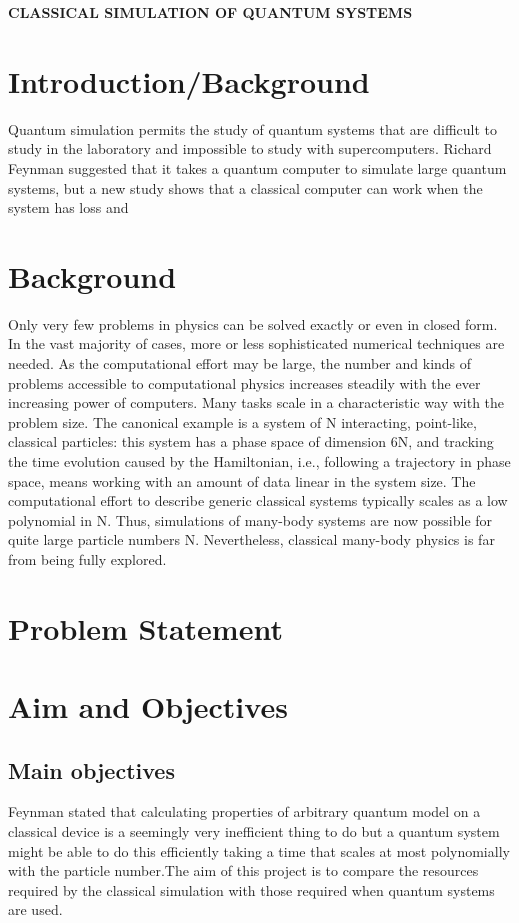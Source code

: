 \documentclass[options]{article}
\begin{document}
\textbf{CLASSICAL SIMULATION OF QUANTUM SYSTEMS}

\section{\textbf{ Introduction/Background}}
Quantum simulation permits the study of quantum systems that are difficult to study in the laboratory and impossible to study with supercomputers.
Richard Feynman suggested that it takes a quantum computer to simulate large quantum systems, but a new study shows that a classical computer can work when the system has loss and 


\section{\textbf{ Background }}
Only very few problems in physics can be solved exactly or even in closed form. In the vast majority of cases, more or less sophisticated numerical techniques are needed. As the computational effort may be large, the number and kinds of problems accessible to computational physics increases steadily with the ever increasing power of computers. Many tasks scale in a characteristic way with the problem size. The canonical example is a system of N interacting, point-like, classical particles: this system has a phase space of dimension 6N, and tracking the time evolution caused by the Hamiltonian, i.e., following a trajectory in phase space, means working with an amount of data linear in the system size. The computational effort to describe generic classical systems typically scales as a low polynomial in N. Thus, simulations of many-body systems are now possible for quite large particle numbers N. Nevertheless, classical many-body physics is far from being fully explored.

\section{\textbf{ Problem Statement}}

\section{\textbf{ Aim and Objectives}}

\subsection{Main objectives}
Feynman stated that calculating properties of arbitrary quantum model on a classical device is a seemingly very inefficient thing to do but a quantum system might be able to do this efficiently taking a time that scales at most polynomially with the particle number.The aim of this project is to compare the resources required by the classical simulation with those required when quantum systems are used.
\end{document}
